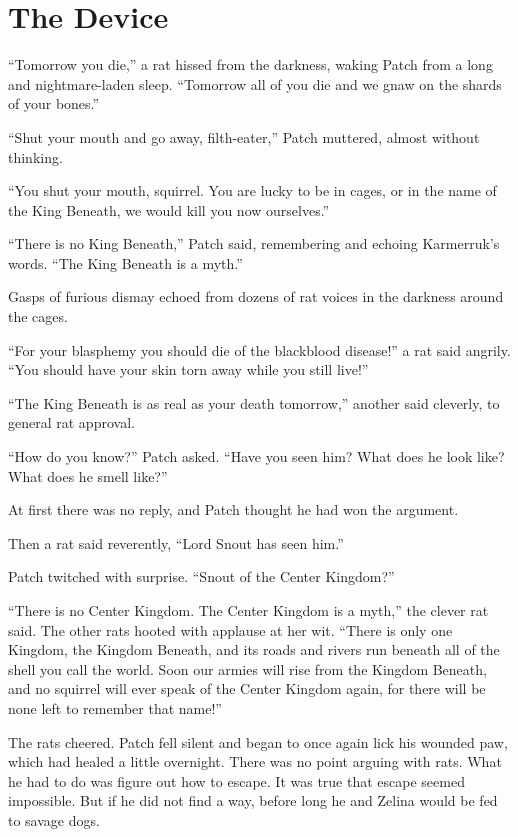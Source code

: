 \documentclass[12pt]{memoir}
\begin{document}

\section{The Device}

“Tomorrow you die,” a rat hissed from the darkness, waking Patch from
a long and nightmare-laden sleep. “Tomorrow all of you die and we gnaw
on the shards of your bones.”

“Shut your mouth and go away, filth-eater,” Patch muttered, almost
without thinking.

“You shut your mouth, squirrel. You are lucky to be in cages, or in
the name of the King Beneath, we would kill you now ourselves.”

“There is no King Beneath,” Patch said, remembering and echoing
Karmerruk’s words. “The King Beneath is a myth.”

Gasps of furious dismay echoed from dozens of rat voices in the
darkness around the cages.

“For your blasphemy you should die of the blackblood disease!” a rat
said angrily. “You should have your skin torn away while you still
live!”

“The King Beneath is as real as your death tomorrow,” another said
cleverly, to general rat approval.

“How do you know?” Patch asked. “Have you seen him? What does he look
like? What does he smell like?”

At first there was no reply, and Patch thought he had won the
argument.

Then a rat said reverently, “Lord Snout has seen him.”

Patch twitched with surprise. “Snout of the Center Kingdom?”

“There is no Center Kingdom. The Center Kingdom is a myth,” the clever
rat said. The other rats hooted with applause at her wit. “There is
only one Kingdom, the Kingdom Beneath, and its roads and rivers run
beneath all of the shell you call the world. Soon our armies will rise
from the Kingdom Beneath, and no squirrel will ever speak of the
Center Kingdom again, for there will be none left to remember that
name!”

The rats cheered. Patch fell silent and began to once again lick his
wounded paw, which had healed a little overnight. There was no point
arguing with rats. What he had to do was figure out how to escape. It
was true that escape seemed impossible. But if he did not find a way,
before long he and Zelina would be fed to savage dogs.
\end{document}
